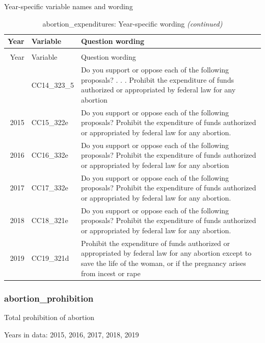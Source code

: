 \documentclass[12pt]{article}
\begin{document}
\endgroup{}

Year-specific variable names and wording

\begin{longtable}[t]{rl>{\raggedright\arraybackslash}p{10cm}}
\caption{\label{tab:unnamed-chunk-4}abortion\_expenditures: Year-specific wording}\\
\toprule
Year & Variable & Question wording\\
\midrule
\endfirsthead
\caption[]{abortion\_expenditures: Year-specific wording \textit{(continued)}}\\
\toprule
Year & Variable & Question wording\\
\midrule
\endhead
\
\endfoot
\bottomrule
\endlastfoot
2014 & CC14\_323\_5 & Do you support or oppose each of the following proposals? . . . Prohibit the expenditure of funds authorized or appropriated by federal law for any abortion\\
2015 & CC15\_322e & Do you support or oppose each of the following proposals? Prohibit the expenditure of funds authorized or appropriated by federal law for any abortion.\\
2016 & CC16\_332e & Do you support or oppose each of the following proposals? Prohibit the expenditure of funds authorized or appropriated by federal law for any abortion\\
2017 & CC17\_332e & Do you support or oppose each of the following proposals? Prohibit the expenditure of funds authorized or appropriated by federal law for any abortion.\\
2018 & CC18\_321e & Do you support or oppose each of the following proposals? Prohibit the expenditure of funds authorized or appropriated by federal law for any abortion.\\
2019 & CC19\_321d & Prohibit the expenditure of funds authorized or appropriated by federal law for any abortion except to save the life of the woman, or if the pregnancy arises from incest or rape\\*
\end{longtable}

\subsubsection{abortion\_prohibition}\label{abortion_prohibition}

Total prohibition of abortion

Years in data: 2015, 2016, 2017, 2018,
2019\begingroup\fontsize{10}{12}\selectfont
\end{document}
